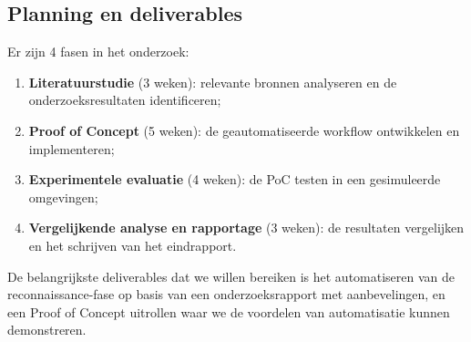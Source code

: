 \subsection{Planning en deliverables}
Er zijn 4 fasen in het onderzoek:
\begin{enumerate}
    \item \textbf{Literatuurstudie} (3 weken): relevante bronnen analyseren en de onderzoeksresultaten identificeren;
    \item \textbf{Proof of Concept} (5 weken): de geautomatiseerde workflow ontwikkelen en implementeren;
    \item \textbf{Experimentele evaluatie} (4 weken): de PoC testen in een gesimuleerde omgevingen;
    \item \textbf{Vergelijkende analyse en rapportage} \newline (3 weken): de resultaten vergelijken en het schrijven van het eindrapport.
\end{enumerate}

De belangrijkste deliverables dat we willen bereiken is het automatiseren van de reconnaissance-fase op
basis van een onderzoeksrapport met aanbevelingen, en een Proof of Concept uitrollen waar we de voordelen
van automatisatie kunnen demonstreren.





